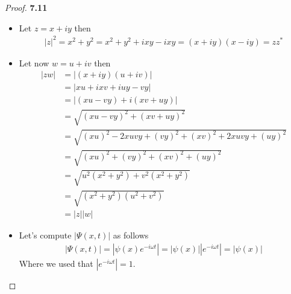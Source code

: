 \documentclass[11pt]{article}
\theoremstyle{definition}
\begin{document}
\begin{proof}{\textbf{7.11}}
\begin{itemize}
    \item [\textbf{(a)}] Let $z = x + iy$ then
    \begin{align*}
        |z|^2 = x^2 + y^2 = x^2 + y^2 + ixy - ixy = (x + iy)(x - iy) =zz^*
    \end{align*}
    \item [\textbf{(b)}] Let now $w = u + iv$ then
    \begin{align*}
        |zw| &= |(x + iy)(u + iv)|\\
        &= |xu +ixv +iuy - vy|\\
        &= |(xu - vy) + i(xv + uy)|\\
        &= \sqrt{(xu - vy)^2 + (xv + uy)^2}\\
        &= \sqrt{(xu)^2 - 2xuvy + (vy)^2 + (xv)^2 + 2xuvy + (uy)^2}\\
        &= \sqrt{(xu)^2 + (vy)^2 + (xv)^2 + (uy)^2}\\
        &= \sqrt{u^2(x^2 + y^2) + v^2(x^2 + y^2)}\\
        &= \sqrt{(x^2 + y^2)(u^2 + v^2)}\\
        &= |z||w|
    \end{align*}
    \item [\textbf{(c)}] Let's compute $|\Psi(x,t)|$ as follows
    \begin{align*}
        |\Psi(x,t)| = |\psi(x)e^{-i\omega t}| = |\psi(x)||e^{-i\omega t}|
        = |\psi(x)|
    \end{align*}
    Where we used that $|e^{-i\omega t}| = 1$.
\end{itemize}
\end{proof}
\end{document}
